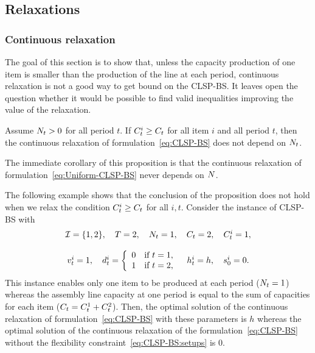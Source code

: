 \subsection{Relaxations}
\label{sec:PDP:deterministic:theoretical-results:continuous-relaxation}


\subsubsection{Continuous relaxation}


The goal of this section is to show that, unless the capacity production of one item is smaller than the production of the line at each period, continuous relaxation is not a good way to get bound on the CLSP-BS.
It leaves open the question whether it would be possible to find valid inequalities improving the value of the relaxation.


\begin{prop}\label{prop:relaxation-independant-N}
Assume $N_t>0$ for all period $t$.
If $C_t^i\ge C_t$ for all item $i$ and all period $t$, then the continuous relaxation of formulation~\eqref{eq:CLSP-BS} does not depend on $N_t$.
\end{prop}


The immediate corollary of this proposition is that the continuous relaxation of formulation~\eqref{eq:Uniform-CLSP-BS} never depends on $N$.


The following example shows that the conclusion of the proposition does not hold when we relax the condition $C_t^i\ge C_t$ for all $i,t$.
Consider the instance of CLSP-BS with
\begin{equation}
\begin{array}{c}
  \REF=\crbracket{1,2}
  ,\quad
  \horizon=2
  ,\quad
  \nbsetups_t=1
  ,\quad
  \capacity_t=2
  ,\quad
  \capacity_t^i=1
  ,
\\ \\
  \rate_t^i=1
  ,\quad
  \demand_t^i
  =\left\{
  \begin{array}{ll}
  0 & \mbox{if}\ t=1,
  \\
  1 & \mbox{if}\ t=2,
  \end{array}
  \right.
  \quad
  \holding_t^i=\holding
  ,\quad
  \inventory_0^i=0.
\end{array}
\end{equation}
This instance enables only one item to be produced at each period ($N_t=1$) whereas the assembly line capacity at one period is equal to the sum of capacities for each item ($C_t=C_t^1+C_t^2$).
Then, the optimal solution of the continuous relaxation of formulation~\eqref{eq:CLSP-BS} with these parameters is $h$ whereas the optimal solution of the continuous relaxation of the formulation~\eqref{eq:CLSP-BS} without the flexibility constraint~\eqref{eq:CLSP-BS:setups} is 0.


